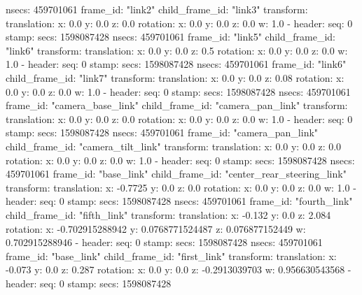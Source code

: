         nsecs: 459701061
      frame_id: "link2"
    child_frame_id: "link3"
    transform: 
      translation: 
        x: 0.0
        y: 0.0
        z: 0.0
      rotation: 
        x: 0.0
        y: 0.0
        z: 0.0
        w: 1.0
  - 
    header: 
      seq: 0
      stamp: 
        secs: 1598087428
        nsecs: 459701061
      frame_id: "link5"
    child_frame_id: "link6"
    transform: 
      translation: 
        x: 0.0
        y: 0.0
        z: 0.5
      rotation: 
        x: 0.0
        y: 0.0
        z: 0.0
        w: 1.0
  - 
    header: 
      seq: 0
      stamp: 
        secs: 1598087428
        nsecs: 459701061
      frame_id: "link6"
    child_frame_id: "link7"
    transform: 
      translation: 
        x: 0.0
        y: 0.0
        z: 0.08
      rotation: 
        x: 0.0
        y: 0.0
        z: 0.0
        w: 1.0
  - 
    header: 
      seq: 0
      stamp: 
        secs: 1598087428
        nsecs: 459701061
      frame_id: "camera_base_link"
    child_frame_id: "camera_pan_link"
    transform: 
      translation: 
        x: 0.0
        y: 0.0
        z: 0.0
      rotation: 
        x: 0.0
        y: 0.0
        z: 0.0
        w: 1.0
  - 
    header: 
      seq: 0
      stamp: 
        secs: 1598087428
        nsecs: 459701061
      frame_id: "camera_pan_link"
    child_frame_id: "camera_tilt_link"
    transform: 
      translation: 
        x: 0.0
        y: 0.0
        z: 0.0
      rotation: 
        x: 0.0
        y: 0.0
        z: 0.0
        w: 1.0
  - 
    header: 
      seq: 0
      stamp: 
        secs: 1598087428
        nsecs: 459701061
      frame_id: "base_link"
    child_frame_id: "center_rear_steering_link"
    transform: 
      translation: 
        x: -0.7725
        y: 0.0
        z: 0.0
      rotation: 
        x: 0.0
        y: 0.0
        z: 0.0
        w: 1.0
  - 
    header: 
      seq: 0
      stamp: 
        secs: 1598087428
        nsecs: 459701061
      frame_id: "fourth_link"
    child_frame_id: "fifth_link"
    transform: 
      translation: 
        x: -0.132
        y: 0.0
        z: 2.084
      rotation: 
        x: -0.702915288942
        y: 0.0768771524487
        z: 0.076877152449
        w: 0.702915288946
  - 
    header: 
      seq: 0
      stamp: 
        secs: 1598087428
        nsecs: 459701061
      frame_id: "base_link"
    child_frame_id: "first_link"
    transform: 
      translation: 
        x: -0.073
        y: 0.0
        z: 0.287
      rotation: 
        x: 0.0
        y: 0.0
        z: -0.2913039703
        w: 0.956630543568
  - 
    header: 
      seq: 0
      stamp: 
        secs: 1598087428
